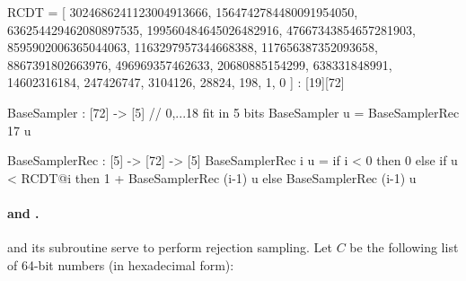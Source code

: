 \begin{code}
  RCDT = [
    3024686241123004913666,
    1564742784480091954050,
    636254429462080897535,
    199560484645026482916,
    47667343854657281903,
    8595902006365044063,
    1163297957344668388,
    117656387352093658,
    8867391802663976,
    496969357462633,
    20680885154299,
    638331848991,
    14602316184,
    247426747,
    3104126,
    28824,
    198,
    1,
    0
  ] : [19][72]
\end{code}

\begin{algorithm}[!htb]
	\caption{$\basesampler()$}\label{alg:basesampler}
	\begin{algorithmic}[1]
		\Require {-}
		 
		\label{line:basesampler} 
		 
		\EndFor
	\end{algorithmic}
\end{algorithm}

\begin{code}
  BaseSampler : [72] -> [5] // {0,...18} fit in 5 bits
  BaseSampler u = BaseSamplerRec 17 u

  BaseSamplerRec : [5] -> [72] -> [5]
  BaseSamplerRec i u = 
    if i < 0
    then 0
    else
      if u < RCDT@i 
      then 1 + BaseSamplerRec (i-1) u
      else BaseSamplerRec (i-1) u
\end{code}

\paragraph{\berexp and \approxexp.} \longberexp and its subroutine \longapproxexp serve to perform rejection sampling. Let $C$ be the following list of 64-bit numbers (in hexadecimal form):

